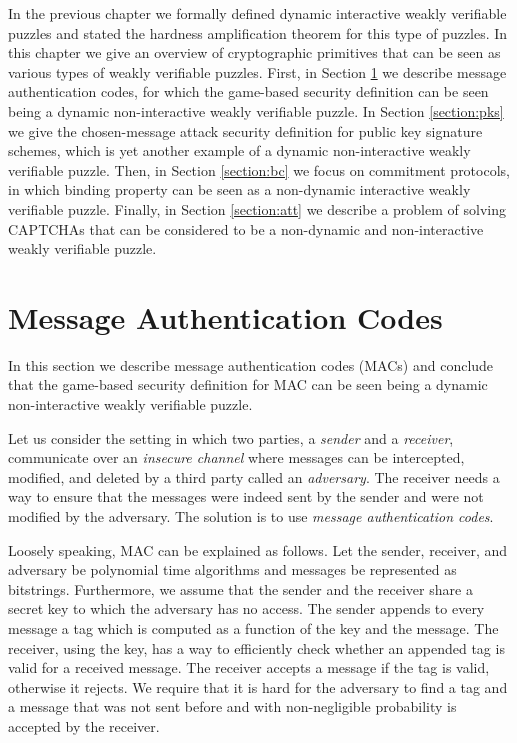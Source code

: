 %
In the previous chapter we formally defined dynamic interactive weakly verifiable puzzles
and stated the hardness amplification theorem for this type of puzzles.
In this chapter we give an overview of cryptographic primitives that can be seen as various types of weakly verifiable puzzles.
First, in Section \ref{section:mac} we describe message authentication codes, for which the game-based security definition can be seen being a dynamic
non-interactive weakly verifiable puzzle.
In Section \ref{section:pks} we give the chosen-message attack security definition
for public key signature schemes, which is yet another example of a dynamic non-interactive weakly verifiable puzzle.
Then, in Section \ref{section:bc} we focus on commitment protocols, in which binding property can be seen as a non-dynamic interactive  weakly verifiable puzzle.
Finally, in Section \ref{section:att} we describe a problem of solving CAPTCHAs that can be considered to be a non-dynamic and non-interactive weakly verifiable puzzle.

\section{Message Authentication Codes}
\label{section:mac}
In this section we describe message authentication codes (MACs) and conclude that the game-based security definition for MAC
can be seen being a dynamic non-interactive weakly verifiable puzzle.

Let us consider the setting in which two parties, a \textit{sender} and a \textit{receiver}, communicate over an \textit{insecure channel} where
messages can be intercepted, modified, and deleted by a third party called an \textit{adversary}.
The receiver needs a way to ensure that the messages were indeed sent by the sender and were not modified by the adversary.
The solution is to use \textit{message authentication codes}.

Loosely speaking, MAC can be explained as follows.
Let the sender, receiver, and adversary be polynomial time algorithms and messages be represented as bitstrings.
Furthermore, we assume that the sender and the receiver share a secret key to which the adversary has no access.
The sender appends to every message a tag which is computed as a function of the key and the message.
The receiver, using the key, has a way to efficiently check whether an appended tag is valid for a received message.
The receiver accepts a message if the tag is valid, otherwise it rejects.
We require that it is hard for the adversary to find a tag and a message that was not sent before and
with non-negligible probability is accepted by the receiver.

